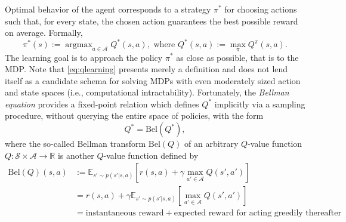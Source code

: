 \documentclass[10pt,letterpaper]{article}
\DeclareMathOperator{\argmax}{argmax}
\begin{document}
Optimal behavior of the agent corresponds to
a strategy $\pi^*$ for choosing actions such that, for every state, the chosen action guarantees the best possible reward on average. Formally,
\begin{equation}
  \pi^*(s) := \argmax_{a \in \mathcal A}{Q}^*(s, a),\text{ where }Q^*(s, a) := \max_{\pi}Q^\pi(s,a).
  \label{eq:qlearning}
\end{equation}
The learning goal is to approach the
policy $\pi^*$ as close as possible, that is to  the MDP.
Note that \eqref{eq:qlearning} presents merely a definition and
does not lend itself as a candidate schema
for solving MDPs with even moderately sized action and state spaces
(i.e., computational intractability).
Fortunately, the \textit{Bellman equation} \citep{sutton1998reinforcement} provides a fixed-point relation which defines $Q^*$ implicitly via a sampling procedure, without querying the entire space of policies, with the form
\begin{equation}
  Q^* = \text{Bel}(Q^*),
  \label{eq:bellman}
\end{equation}
where the so-called Bellman transform $\text{Bel}(Q)$
of an arbitrary $Q$-value function $Q: \mathcal S \times \mathcal A \rightarrow \mathbb R$  is another $Q$-value function defined by
\begin{equation}
  \begin{split}
   \text{Bel}(Q)(s,a) &:=
   \mathbb E_{s' \sim p(s'|s,a)} [r(s,a) + \gamma \max_{a' \in \mathcal A}Q(s', a')]\\
   &= r(s,a) + \gamma\mathbb E_{s' \sim p(s'|s,a)} [\max_{a' \in \mathcal A}Q(s', a')]\\
   &= \text{instantaneous reward} + \text{expected reward for acting greedily thereafter}
    \end{split}
  \end{equation}
\end{document}

